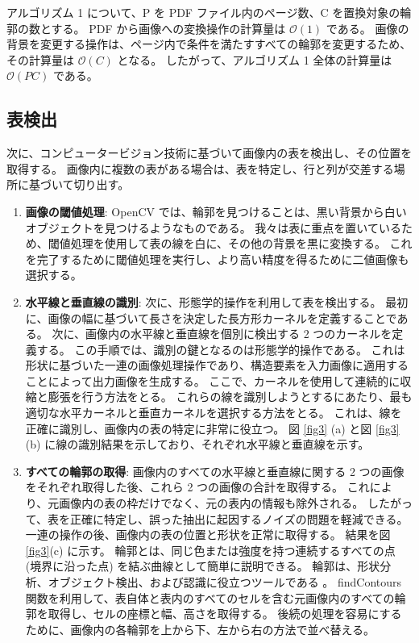 \documentclass[uplatex, twocolumn,10pt]{jsarticle}
\begin{document}
アルゴリズム 1 について、P を PDF ファイル内のページ数、C を置換対象の輪郭の数とする。
PDF から画像への変換操作の計算量は $\mathcal{O}(1)$ である。
画像の背景を変更する操作は、ページ内で条件を満たすすべての輪郭を変更するため、その計算量は $\mathcal{O}(C)$ となる。
したがって、アルゴリズム 1 全体の計算量は $\mathcal{O}(PC)$ である。

\subsection{表検出}
次に、コンピュータービジョン技術に基づいて画像内の表を検出し、その位置を取得する。
画像内に複数の表がある場合は、表を特定し、行と列が交差する場所に基づいて切り出す。

\begin{enumerate}
    \item \textbf{画像の閾値処理}: 
    OpenCV では、輪郭を見つけることは、黒い背景から白いオブジェクトを見つけるようなものである。
    我々は表に重点を置いているため、閾値処理を使用して表の線を白に、その他の背景を黒に変換する。
    これを完了するために閾値処理を実行し、より高い精度を得るために二値画像も選択する。
    \item \textbf{水平線と垂直線の識別}:
    次に、形態学的操作を利用して表を検出する。
    最初に、画像の幅に基づいて長さを決定した長方形カーネルを定義することである。
    次に、画像内の水平線と垂直線を個別に検出する 2 つのカーネルを定義する。
    この手順では、識別の鍵となるのは形態学的操作である。
    これは形状に基づいた一連の画像処理操作であり、構造要素を入力画像に適用することによって出力画像を生成する。
    ここで、カーネルを使用して連続的に収縮と膨張を行う方法をとる。
    これらの線を識別しようとするにあたり、最も適切な水平カーネルと垂直カーネルを選択する方法をとる。
    これは、線を正確に識別し、画像内の表の特定に非常に役立つ。
    図 \ref{fig3} (a) と図 \ref{fig3} (b) に線の識別結果を示しており、それぞれ水平線と垂直線を示す。
    \item \textbf{すべての輪郭の取得}:
    画像内のすべての水平線と垂直線に関する 2 つの画像をそれぞれ取得した後、これら 2 つの画像の合計を取得する。
    これにより、元画像内の表の枠だけでなく、元の表内の情報も除外される。
    したがって、表を正確に特定し、誤った抽出に起因するノイズの問題を軽減できる。
    一連の操作の後、画像内の表の位置と形状を正常に取得する。
    結果を図 \ref{fig3}(c) に示す。
    輪郭とは、同じ色または強度を持つ連続するすべての点 (境界に沿った点) を結ぶ曲線として簡単に説明できる。
    輪郭は、形状分析、オブジェクト検出、および認識に役立つツールである \cite{bib24}。
    findContours 関数を利用して、表自体と表内のすべてのセルを含む元画像内のすべての輪郭を取得し、セルの座標と幅、高さを取得する。
    後続の処理を容易にするために、画像内の各輪郭を上から下、左から右の方法で並べ替える。
\end{enumerate}
\end{document}

